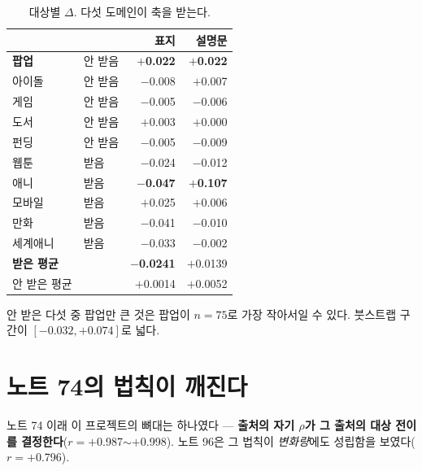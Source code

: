 \documentclass[10pt]{article}
\begin{document}
\begin{table}[t]
\centering\tsize
\caption{대상별 $\Delta$. 다섯 도메인이 축을 받는다.}
\begin{tabular}{llrr}
\toprule
& & 표지 & 설명문 \\
\midrule
\textbf{팝업} & 안 받음 & \textbf{$+$0.022} & \textbf{$+$0.022} \\
아이돌 & 안 받음 & $-$0.008 & $+$0.007 \\
게임 & 안 받음 & $-$0.005 & $-$0.006 \\
도서 & 안 받음 & $+$0.003 & $+$0.000 \\
펀딩 & 안 받음 & $-$0.005 & $-$0.009 \\
\midrule
웹툰 & 받음 & $-$0.024 & $-$0.012 \\
애니 & 받음 & \textbf{$-$0.047} & \textbf{$+$0.107} \\
모바일 & 받음 & $+$0.025 & $+$0.006 \\
만화 & 받음 & $-$0.041 & $-$0.010 \\
세계애니 & 받음 & $-$0.033 & $-$0.002 \\
\midrule
\textbf{받은 평균} & & \textbf{$-$0.0241} & $+$0.0139 \\
안 받은 평균 & & $+$0.0014 & $+$0.0052 \\
\bottomrule
\end{tabular}
\end{table}

{안 받은 다섯 중 팝업만 큰 것은 팝업이 $n{=}75$로 가장 작아서일 수 있다.
붓스트랩 구간이 $[-0.032, +0.074]$로 넓다.}

\section{노트 74의 법칙이 깨진다}

노트 74 이래 이 프로젝트의 뼈대는 하나였다 --- \textbf{출처의 자기 $\rho$가
그 출처의 대상 전이를 결정한다}($r=+$0.987$\sim+$0.998). 노트 96은 그 법칙이
\emph{변화량}에도 성립함을 보였다($r=+$0.796).
\end{document}
